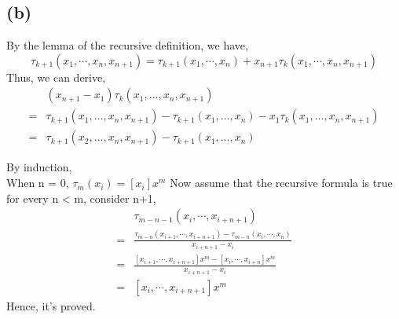 \documentclass[UTF8]{ctexart}
\begin{document}
\subsection*{(b)}
\noindent By the lemma of the recursive definition, we have,
$$\tau_{k+1}\left(x_{1}, \cdots, x_{n}, x_{n+1}\right)=\tau_{k+1}\left(x_{1}, \cdots, x_{n}\right)+x_{n+1} \tau_{k}\left(x_{1}, \cdots, x_{n}, x_{n+1}\right)$$
Thus, we can derive,
\begin{equation}
    \begin{aligned}
    &\left(x_{n+1}-x_{1}\right) \tau_{k}\left(x_{1}, \ldots, x_{n}, x_{n+1}\right) \\
    =& \tau_{k+1}\left(x_{1}, \ldots, x_{n}, x_{n+1}\right)-\tau_{k+1}\left(x_{1}, \ldots, x_{n}\right)-x_{1} \tau_{k}\left(x_{1}, \ldots, x_{n}, x_{n+1}\right) \\
    =& \tau_{k+1}\left(x_{2}, \ldots, x_{n}, x_{n+1}\right)-\tau_{k+1}\left(x_{1}, \ldots, x_{n}\right)
    \nonumber
    \end{aligned}
\end{equation}

\noindent By induction,\\
When n = 0, $\tau_{m}\left(x_{i}\right)=\left[x_{i}\right] x^{m}$
Now assume that the recursive formula is true for every n < m, consider n+1,
\begin{equation}
    \begin{aligned}
    & \tau_{m-n-1}\left(x_{i}, \cdots, x_{i+n+1}\right) \\
    =& \frac{\tau_{m-n}\left(x_{i+1}, \cdots, x_{i+n+1}\right)-\tau_{m-n}\left(x_{i}, \cdots, x_{n}\right)}{x_{i+n+1}-x_{i}} \\
    =& \frac{\left[x_{i+1}, \cdots, x_{i+n+1}\right] x^{m}-\left[x_{i}, \cdots, x_{i+n}\right] x^{m}}{x_{i+n+1}-x_{i}} \\
    =& {\left[x_{i}, \cdots, x_{i+n+1}\right] x^{m} }
    \nonumber
    \end{aligned}
\end{equation}
\noindent Hence, it's proved.
\end{document}
